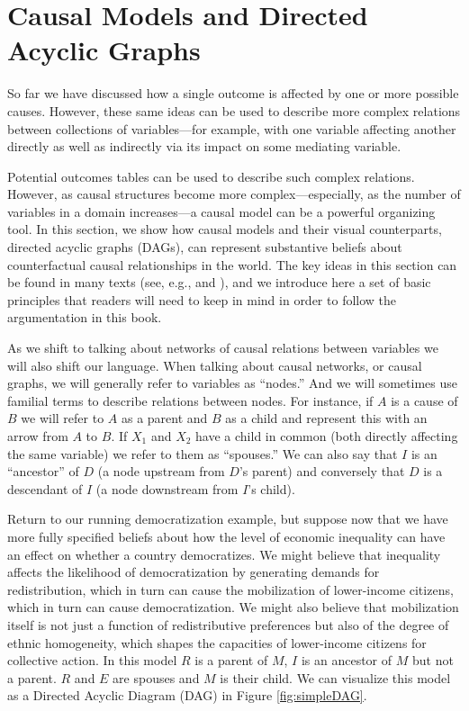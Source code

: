 \documentclass[
  12pt,
]{book}
\begin{document}
\hypertarget{causal-models-and-directed-acyclic-graphs}{%
\section{Causal Models and Directed Acyclic Graphs}\label{causal-models-and-directed-acyclic-graphs}}

So far we have discussed how a single outcome is affected by one or more possible causes. However, these same ideas can be used to describe more complex relations between collections of variables---for example, with one variable affecting another directly as well as indirectly via its impact on some mediating variable.

Potential outcomes tables can be used to describe such complex relations. However, as causal structures become more complex---especially, as the number of variables in a domain increases---a causal model can be a powerful organizing tool. In this section, we show how causal models and their visual counterparts, directed acyclic graphs (DAGs), can represent substantive beliefs about counterfactual causal relationships in the world. The key ideas in this section can be found in many texts (see, e.g., \citet{halpern2005causesa} and \citet{galles1998axiomatic}), and we introduce here a set of basic principles that readers will need to keep in mind in order to follow the argumentation in this book.

As we shift to talking about networks of causal relations between variables we will also shift our language. When talking about causal networks, or causal graphs, we will generally refer to variables as ``nodes.'' And we will sometimes use familial terms to describe relations between nodes. For instance, if \(A\) is a cause of \(B\) we will refer to \(A\) as a parent and \(B\) as a child and represent this with an arrow from \(A\) to \(B\). If \(X_1\) and \(X_2\) have a child in common (both directly affecting the same variable) we refer to them as ``spouses.'' We can also say that \(I\) is an ``ancestor'' of \(D\) (a node upstream from \(D\)'s parent) and conversely that \(D\) is a descendant of \(I\) (a node downstream from \(I\)'s child).

Return to our running democratization example, but suppose now that we have more fully specified beliefs about how the level of economic inequality can have an effect on whether a country democratizes. We might believe that inequality affects the likelihood of democratization by generating demands for redistribution, which in turn can cause the mobilization of lower-income citizens, which in turn can cause democratization. We might also believe that mobilization itself is not just a function of redistributive preferences but also of the degree of ethnic homogeneity, which shapes the capacities of lower-income citizens for collective action. In this model \(R\) is a parent of \(M\), \(I\) is an ancestor of \(M\) but not a parent. \(R\) and \(E\) are spouses and \(M\) is their child. We can visualize this model as a Directed Acyclic Diagram (DAG) in Figure \ref{fig:simpleDAG}.
\end{document}
